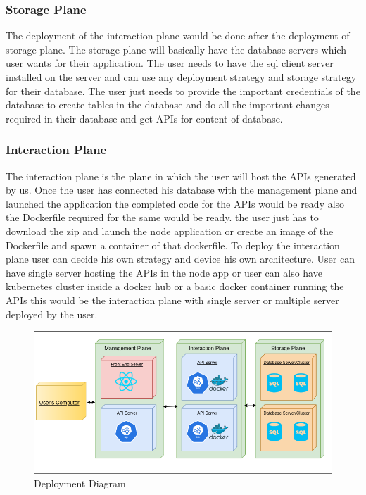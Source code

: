 \documentclass[letterpaper, 10 pt, conference]{ieeeconf}
\begin{document}
\subsubsection{Storage Plane}
The deployment of the interaction plane would be done after the deployment of storage plane. The storage plane will basically have the database servers which user wants for their application. The user needs to have the sql client server installed on the server and can use any deployment strategy and storage strategy for their database. The user just needs to provide the important credentials of the database to create tables in the database and do all the important changes required in their database and get APIs for content of database.
\subsubsection{Interaction Plane}
The interaction plane is the plane in which the user will host the APIs generated by us. Once the user has connected his database with the management plane and launched the application the completed code for the APIs would be ready also the Dockerfile required for the same would be ready. the user just has to download the zip and launch the node application or create an image of the Dockerfile and spawn a container of that dockerfile.
To deploy the interaction plane user can decide his own strategy and device his own architecture. User can have single server hosting the APIs in the node app or user can also have kubernetes cluster inside a docker hub or a basic docker container running the APIs this would be the interaction plane with single server or multiple server deployed by the user.


\begin{figure}[h]
   \centering
   \includegraphics[scale=0.27]{./DeploymentDiagram.png}
   \caption{Deployment Diagram}
   \label{fig:my_label}
\end{figure}
\end{document}

